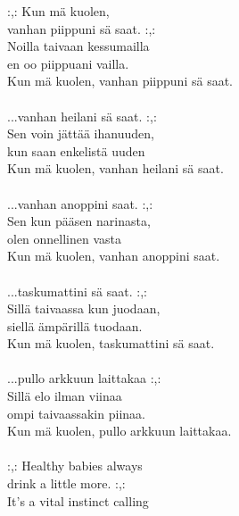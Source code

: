 
            :,: Kun mä kuolen, \\
            vanhan piippuni sä saat. :,: \\
            Noilla taivaan kessumailla \\
            en oo piippuani vailla. \\
            Kun mä kuolen, vanhan piippuni sä saat. \\
\hspace{10mm} \\
            ...vanhan heilani sä saat. :,: \\
            Sen voin jättää ihanuuden, \\
            kun saan enkelistä uuden \\
            Kun mä kuolen, vanhan heilani sä saat. \\
\hspace{10mm} \\
            ...vanhan anoppini saat. :,: \\
            Sen kun pääsen narinasta, \\
            olen onnellinen vasta \\
            Kun mä kuolen, vanhan anoppini saat. \\
\hspace{10mm} \\
            ...taskumattini sä saat. :,: \\
            Sillä taivaassa kun juodaan, \\
            siellä ämpärillä tuodaan. \\
            Kun mä kuolen, taskumattini sä saat. \\
\hspace{10mm} \\
            ...pullo arkkuun laittakaa :,: \\
            Sillä elo ilman viinaa \\
            ompi taivaassakin piinaa. \\
            Kun mä kuolen, pullo arkkuun laittakaa. \\
\hspace{10mm} \\
            :,: Healthy babies always \\
            drink a little more. :,: \\
            It’s a vital instinct calling \\
